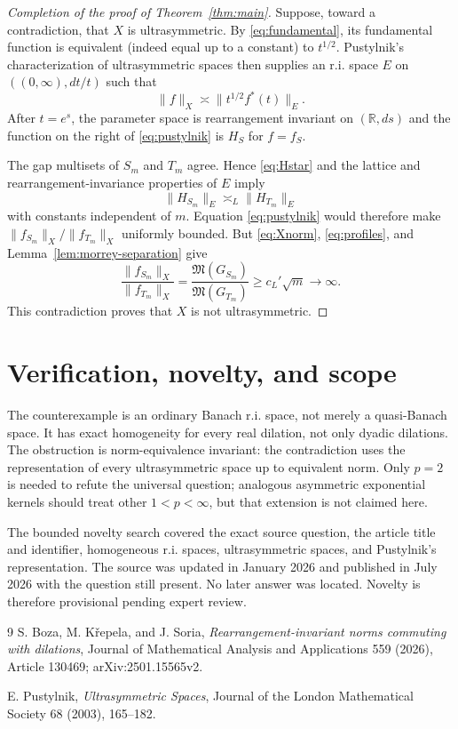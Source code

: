 \documentclass[11pt]{article}
\newcommand{\R}{\mathbb R}
\newcommand{\Mcal}{\mathfrak M}
\begin{document}
\begin{proof}[Completion of the proof of Theorem~\ref{thm:main}]
Suppose, toward a contradiction, that $X$ is ultrasymmetric.  By
\eqref{eq:fundamental}, its fundamental function is equivalent (indeed equal
up to a constant) to $t^{1/2}$.  Pustylnik's characterization of
ultrasymmetric spaces \cite[Theorems~2.1--2.2]{Pus} then supplies an r.i.
space $E$ on $((0,\infty),dt/t)$ such that
\begin{equation}\label{eq:pustylnik}
 \|f\|_X\asymp\|t^{1/2}f^*(t)\|_E.
\end{equation}
After $t=e^s$, the parameter space is rearrangement invariant on
$(\R,ds)$ and the function on the right of \eqref{eq:pustylnik} is $H_S$ for
$f=f_S$.

The gap multisets of $S_m$ and $T_m$ agree.  Hence \eqref{eq:Hstar} and the
lattice and rearrangement-invariance properties of $E$ imply
\[
 \|H_{S_m}\|_E\asymp_L\|H_{T_m}\|_E
\]
with constants independent of $m$.  Equation \eqref{eq:pustylnik} would
therefore make $\|f_{S_m}\|_X/\|f_{T_m}\|_X$ uniformly bounded.  But
\eqref{eq:Xnorm}, \eqref{eq:profiles}, and
Lemma~\ref{lem:morrey-separation} give
\[
 \frac{\|f_{S_m}\|_X}{\|f_{T_m}\|_X}
 =\frac{\Mcal(G_{S_m})}{\Mcal(G_{T_m})}
 \geq c_L'\sqrt m\longrightarrow\infty.
\]
This contradiction proves that $X$ is not ultrasymmetric.
\end{proof}

\section*{Verification, novelty, and scope}

The counterexample is an ordinary Banach r.i. space, not merely a quasi-Banach
space.  It has exact homogeneity for every real dilation, not only dyadic
dilations.  The obstruction is norm-equivalence invariant: the contradiction
uses the representation of every ultrasymmetric space up to equivalent norm.
Only $p=2$ is needed to refute the universal question; analogous asymmetric
exponential kernels should treat other $1<p<\infty$, but that extension is
not claimed here.

The bounded novelty search covered the exact source question, the article
title and identifier, homogeneous r.i. spaces, ultrasymmetric spaces, and
Pustylnik's representation.  The source was updated in January 2026 and
published in July 2026 with the question still present.  No later answer was
located.  Novelty is therefore provisional pending expert review.

\begin{thebibliography}{9}
S. Boza, M. K\v{r}epela, and J. Soria,
\emph{Rearrangement-invariant norms commuting with dilations},
Journal of Mathematical Analysis and Applications 559 (2026), Article 130469;
arXiv:2501.15565v2.

E. Pustylnik,
\emph{Ultrasymmetric Spaces},
Journal of the London Mathematical Society 68 (2003), 165--182.
\end{thebibliography}
\end{document}

